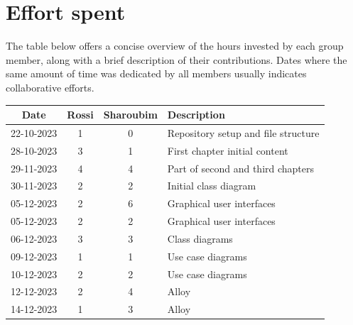 \documentclass[12pt, a4paper]{report}
\begin{document}
\chapter{Effort spent}
    The table below offers a concise overview of the hours invested by each group member, along with a brief description of their contributions. 
    Dates where the same amount of time was dedicated by all members usually indicates collaborative efforts.
    \begin{table}[H]
        \centering
        \begin{tabular}{cccl}
            \textbf{Date}   & \textbf{Rossi}            & \textbf{Sharoubim}            & \textbf{Description}                          \\ \hline
            22-10-2023      & 1                         & 0                             & Repository setup and file structure           \\ 
            28-10-2023      & 3                         & 1                             & First chapter initial content                 \\ 
            29-11-2023      & 4                         & 4                             & Part of second and third chapters             \\
            30-11-2023      & 2                         & 2                             & Initial class diagram                         \\
            05-12-2023      & 2                         & 6                             & Graphical user interfaces                     \\
            05-12-2023      & 2                         & 2                             & Graphical user interfaces                     \\
            06-12-2023      & 3                         & 3                             & Class diagrams                                \\
            09-12-2023      & 1                         & 1                             & Use case diagrams                             \\
            10-12-2023      & 2                         & 2                             & Use case diagrams                             \\
            12-12-2023      & 2                         & 4                             & Alloy                                         \\
            14-12-2023      & 1                         & 3                             & Alloy                                         \\

\end{tabular}
\end{table}
\end{document}
